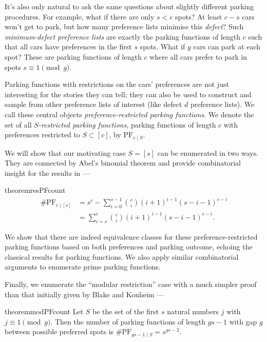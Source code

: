 \documentclass[12 pt]{amsart}
\theoremstyle{definition} %
\theoremstyle{remark} %
\begin{document}
It's also only natural to ask the same questions about slightly different parking procedures. For example, what if there are only $s < c$ spots? At least $c - s$ cars won't get to park, but how many preference lists minimise this \emph{defect}? Such \emph{minimum-defect preference lists} are exactly the parking functions of length $c$ such that all cars have preferences in the first $s$ spots. What if $g$ cars can park at each spot? These are parking functions of length $c$ where all cars prefer to park in spots $s \equiv 1 \pmod g$.

Parking functions with restrictions on the cars' preferences are not just interesting for the stories they can tell; they can also be used to construct and sample from other preference lists of interest (like defect $d$ preference lists). We call these central objects \emph{preference-restricted parking functions}. We denote the set of all \emph{$S$-restricted parking functions}, parking functions of length $c$ with preferences restricted to  $S \subset [c]$, by $\mathrm{PF}_{c \mid S}$.

We will show that our motivating case $S = [s]$ can be enumerated in two ways. They are connected by Abel's binomial theorem and provide combinatorial insight for the results in \cite{cameron-johannsen-prellberg-schweitzer-2008} ---
\begin{restatable}{theorem}{resPFcount}
	\label{thm:resPFcount}
	\[
		\begin{split}
			\# \mathrm{PF}_{c \mid [s]} & = s^{c} - \sum_{i = 0}^{s - 1} \binom{c}{i} (i + 1)^{i - 1} (s - i - 1)^{c - i} \\
				    & = \sum_{i = s}^{c} \binom{c}{i} (i + 1)^{i - 1} (s - i - 1)^{c - i}.
		\end{split}
	\]
\end{restatable}

We show that there are indeed equivalence classes for these preference-restricted parking functions based on both preferences and parking outcome, echoing the classical results for parking functions. We also apply similar combinatorial arguments to enumerate prime parking functions.

Finally, we enumerate the ``modular restriction'' case with a much simpler proof than that initially given by Blake and Konheim \cite{blake-konheim-1977} ---

\begin{restatable}{theorem}{modPFcount}
	\label{thm:modPFcount}
	Let $S$ be the set of the first $s$ natural numbers $j$ with $j \equiv 1 \pmod g$. Then the number of parking functions of length $gs - 1$ with gap $g$ between possible preferred spots is $\# \mathrm{PF}_{gs - 1 \mid S} = s^{g s - 2}$.
\end{restatable}
\end{document}
